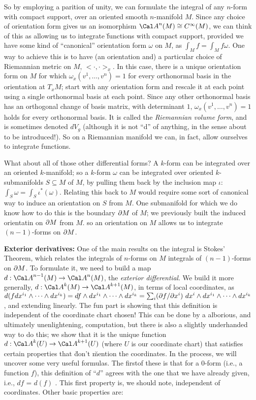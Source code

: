 So by employing a parition of unity, we can formulate the integral of any $n$-form with compact 
support, over an oriented smooth $n$-manifold $M$. Since any choice of orientation form gives us
an isomorphism ${\Cal A}^n(M)\cong C^\infty(M)$, we can think of this as allowing us to integrate
\u{functions} with compact support, provided we have some kind of ``canonical'' orientation form
$\omega$ on $M$, as $\int_M f = \int_M f\omega$. One way to achieve this is to have (an orientation
and) a particular choice of Riemannian metric on $M$, $<\cdot,\cdot>_x$. In this case, there is a
unique orientation form on $M$ for which $\omega_x(v^1,\ldots,v^n)=1$ for every orthonormal basis
in the orientation at $T_xM$; start with any orientation form and rescale it at each point using
a single orthonormal basis at each point. Since any other orthonormal basis has an orthogonal change of
basis matrix, with determinant $1$, $\omega_x(v^1,\ldots,v^n)=1$ holds for every orthonormal basis.
It is called the {\it Riemannian volume form}, and is sometimes denoted $dV_g$ (although it is
not ``d'' of anything, in the sense about to be introduced!).
So on a Riemannian manifold we can, in fact, allow ourselves to integrate functions. 

What about all of those other differential forms? A $k$-form can be integrated over an oriented
$k$-manifold; so a $k$-form $\omega$ can be integrated over oriented $k$-submanifolds $S\subseteq M$
of $M$, by pulling them back by the inclusion map $\iota$: $\int_S\omega = \int_S \iota^*(\omega)$.
Relating this back to $M$ would require some sort of canonical way to induce an orientation on $S$ from $M$.
One submanifold for which we do know how to do this is the boundary $\partial M$ of $M$; we previously
built the induced orientatin on $\partial M$ from $M$. so an orientation on $M$ allows us to
integrate $(n-1)$-forms on $\partial M$. 

\msk

{\bf Exterior derivatives:} One of the main results on the integral is Stokes' Theorem,
which relates the integrals of $n$-forms on $M$ integrals of $(n-1)$-forms on $\partial M$. To formulate it, we 
need to build a map $d:{\Cal A}^{n-1}(M)\ra {\Cal A}^n(M)$, the {\it exterior differential}.
We build it more generally, $d:{\Cal A}^{k}(M)\ra {\Cal A}^{k+1}(M)$, in terms of local coordinates, as
$d(f dx^{i_1}\wedge\cdots\wedge dx^{i_k})=df\wedge dx^{i_1}\wedge\cdots\wedge dx^{i_k}
=\sum_i(\partial f/\partial x^i)\ dx^i\wedge dx^{i_1}\wedge\cdots\wedge dx^{i_k}$, and extending
linearly. The fun part is showing that this definition is independent of the coordinate chart chosen!
This can be done by a alborious, and ultimately unenlightening, computation, but
there is also a slightly underhanded way to do this; we show that it is the unique function
$d:{\Cal A}^{k}(U)\ra {\Cal A}^{k+1}(U)$ (where $U$ is our coordinate chart) that satisfies certain
properties that \u{don't} \u{mention} the coordinates. In the process, we will uncover
some very useful formulas. The firstof these is that for a $0$-form (i.e., a function $f$),
this definition of ``$d$'' agrees with the one that we have already given, i.e., $df$ = $d(f)$ .
This first property is, we should note, independent of coordinates. Other basic properties are:

